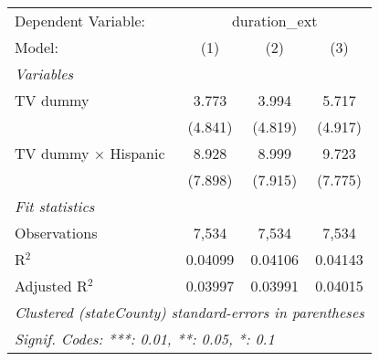 \begin{tabular}{lccc}
\tabularnewline\midrule\midrule
Dependent Variable:&\multicolumn{3}{c}{duration\_ext}\\
Model:&(1) & (2) & (3)\\
\midrule \emph{Variables}&   &   &  \\
TV dummy & 3.773 & 3.994 & 5.717\\
  &(4.841) & (4.819) & (4.917)\\
TV dummy $\times$ Hispanic & 8.928 & 8.999 & 9.723\\
  &(7.898) & (7.915) & (7.775)\\
\midrule \emph{Fit statistics}&  & & \\
Observations & 7,534&7,534&7,534\\
R$^2$ & 0.04099&0.04106&0.04143\\
Adjusted R$^2$ & 0.03997&0.03991&0.04015\\
\midrule\midrule\multicolumn{4}{l}{\emph{Clustered (stateCounty) standard-errors in parentheses}}\\
\multicolumn{4}{l}{\emph{Signif. Codes: ***: 0.01, **: 0.05, *: 0.1}}\\
\end{tabular}


